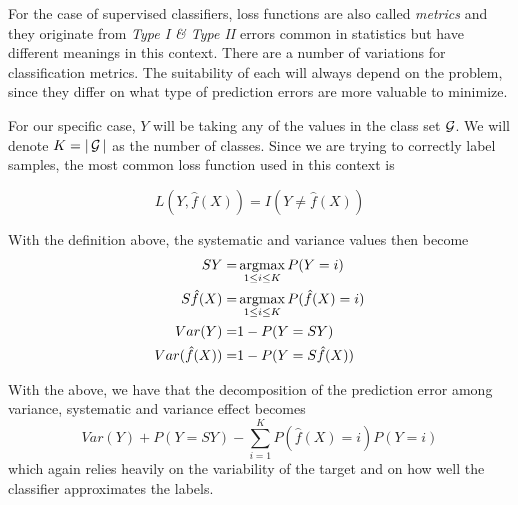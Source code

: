 



For the case of supervised classifiers, loss functions are also called \textit{metrics} and they originate from \textit{Type I \& Type II} errors common in statistics but have different meanings in this context. There are a number of variations for classification metrics. The suitability of each will always depend on the problem, since they differ on what type of prediction errors are more valuable to minimize.

For our specific case, $Y$ will be taking any of the values in the class set $\operatorname{\mathcal{G}}$. We will denote $K = |\operatorname{\mathcal{G}}|$ as the number of classes. Since we are trying to correctly label samples, the most common loss function used in this context is

\begin{equation}
L(Y, \hat{f}(X)) = I(Y \neq \hat{f}(X))
\end{equation}\label{eq:classificationLossFunction}

With the definition above, the systematic and variance values then become
\begin{equation}
	\begin{split}
	SY = & \operatorname*{argmax}_{1\leq i \leq K} P(Y=i) \\
	S\hat{f}(X) = &\operatorname*{argmax}_{1\leq i \leq K} P(\hat{f}(X)=i) \\
	Var(Y) = &1 - P(Y=SY) \\
	Var(\hat{f}(X)) =& 1 - P(Y = S\hat{f}(X)) \\
	\end{split}
\end{equation}


With the above, we have that the decomposition of the prediction error among variance, systematic and variance effect becomes
\begin{equation}
Var(Y) + P(Y=SY) - \sum_{i=1}^K P(\hat{f}(X) =i)P(Y=i)
\end{equation}
	 which again relies heavily on the variability of the target and on how well the classifier approximates the labels.

